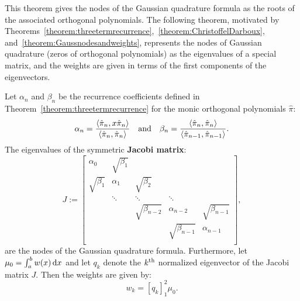 This theorem gives the nodes of the Gaussian quadrature formula as the roots of the associated orthogonal polynomials. The following theorem, motivated by Theorems~\ref{theorem:threetermrecurrence},~\ref{theorem:ChristoffelDarboux}, and~\ref{theorem:Gaussnodesandweights}, represents the nodes of Gaussian quadrature (zeros of orthogonal polynomials) as the eigenvalues of a special matrix, and the weights are given in terms of the first components of the eigenvectors.
\begin{theorem}\label{theorem:JacobiMatrix}
Let $\alpha_n$ and $\beta_n$ be the recurrence coefficients defined in Theorem~\ref{theorem:threetermrecurrence} for the monic orthogonal polynomials $\hat{\pi}$:
\[
\alpha_n = \dfrac{\langle \hat{\pi}_n,x\hat{\pi}_n\rangle}{\langle\hat{\pi}_n,\hat{\pi}_n\rangle}\quad{\rm and}\quad \beta_n = \dfrac{\langle \hat{\pi}_n,\hat{\pi}_n\rangle}{\langle\hat{\pi}_{n-1},\hat{\pi}_{n-1}\rangle}.
\]
The eigenvalues of the symmetric {\bf Jacobi matrix}:
\[
J := \begin{bmatrix}
\alpha_0 & \sqrt{\beta_1}\\
\sqrt{\beta_1} & \alpha_1 & \sqrt{\beta_2}\\
& \ddots & \ddots & \ddots\\
& & \sqrt{\beta_{n-2}} & \alpha_{n-2} & \sqrt{\beta_{n-1}}\\
& & & \sqrt{\beta_{n-1}} & \alpha_{n-1}\\
\end{bmatrix},
\]
are the nodes of the Gaussian quadrature formula. Furthermore, let $\mu_0 = \int_a^b w(x){\rm\,d} x$ and let $q_k$ denote the $k^{\rm th}$ normalized eigenvector of the Jacobi matrix $J$. Then the weights are given by:
\begin{equation}\label{eq:GQweights3}
w_k = [q_k]_1^2\mu_0.
\end{equation}
\end{theorem}

